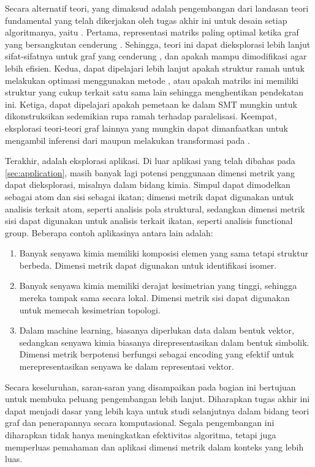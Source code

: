 Secara alternatif teori, yang dimaksud adalah pengembangan dari landasan teori fundamental yang telah dikerjakan oleh tugas akhir ini untuk desain setiap algoritmanya, yaitu . Pertama, representasi matriks paling optimal ketika graf yang bersangkutan cenderung . Sehingga, teori ini dapat dieksplorasi lebih lanjut sifat-sifatnya untuk graf yang cenderung , dan apakah mampu dimodifikasi agar lebih efisien. Kedua, dapat dipelajari lebih lanjut apakah struktur  ramah untuk melakukan optimasi menggunakan metode , atau apakah matriks ini memiliki struktur yang cukup terkait satu sama lain sehingga menghentikan pendekatan ini. Ketiga, dapat dipelajari apakah pemetaan  ke  dalam SMT mungkin untuk dikonstruksikan sedemikian rupa ramah terhadap paralelisasi. Keempat, eksplorasi teori-teori graf lainnya yang mungkin dapat dimanfaatkan untuk mengambil inferensi dari maupun melakukan transformasi pada .

Terakhir, adalah eksplorasi aplikasi. Di luar aplikasi yang telah dibahas pada \autoref{sec:application}, masih banyak lagi potensi penggunaan dimensi metrik yang dapat dieksplorasi, misalnya dalam bidang kimia. Simpul dapat dimodelkan sebagai atom dan sisi sebagai ikatan; dimensi metrik dapat digunakan untuk analisis terkait atom, seperti analisis pola struktural, sedangkan dimensi metrik sisi dapat digunakan untuk analisis terkait ikatan, seperti analisis functional group. Beberapa contoh aplikasinya antara lain adalah:

\begin{enumerate}
	\item Banyak senyawa kimia memiliki komposisi elemen yang sama tetapi struktur berbeda. Dimensi metrik dapat digunakan untuk identifikasi isomer.

	\item Banyak senyawa kimia memiliki derajat kesimetrian yang tinggi, sehingga mereka tampak sama secara lokal. Dimensi metrik sisi dapat digunakan untuk memecah kesimetrian topologi.

	\item Dalam machine learning, biasanya diperlukan data dalam bentuk vektor, sedangkan senyawa kimia biasanya direpresentasikan dalam bentuk simbolik. Dimensi metrik berpotensi berfungsi sebagai encoding yang efektif untuk merepresentasikan senyawa ke dalam representasi vektor.
\end{enumerate}

Secara keseluruhan, saran-saran yang disampaikan pada bagian ini bertujuan untuk membuka peluang pengembangan lebih lanjut. Diharapkan tugas akhir ini dapat menjadi dasar yang lebih kaya untuk studi selanjutnya dalam bidang teori graf dan penerapannya secara komputasional. Segala pengembangan ini diharapkan tidak hanya meningkatkan efektivitas algoritma, tetapi juga memperluas pemahaman dan aplikasi dimensi metrik dalam konteks yang lebih luas.
